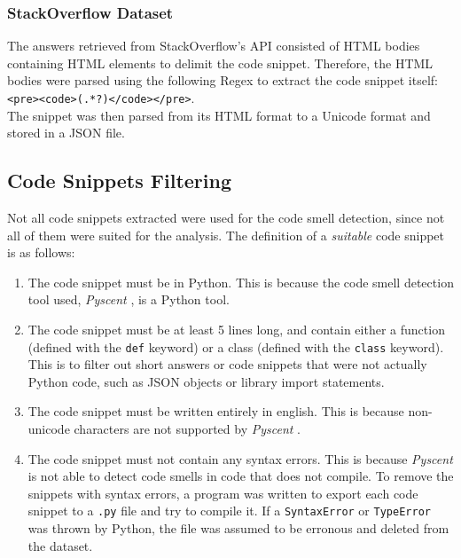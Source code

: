 \subsubsection{StackOverflow Dataset}
The answers retrieved from StackOverflow's API consisted of HTML bodies containing HTML elements to delimit the code snippet. Therefore, the HTML bodies were parsed using the following Regex to extract the code snippet itself: \texttt{<pre><code>(.*?)</code></pre>}. \\

The snippet was then parsed from its HTML format to a Unicode format and stored in a JSON file.


\subsection{Code Snippets Filtering}
Not all code snippets extracted were used for the code smell detection, since not all of them were suited for the analysis. The definition of a \textit{suitable} code snippet is as follows: \\

\begin{enumerate}
    \item The code snippet must be in Python. This is because the code smell detection tool used, \textit{Pyscent} , is a Python tool. \\

    \item The code snippet must be at least 5 lines long, and contain either a function (defined with the \texttt{def} keyword) or a class (defined with the \texttt{class} keyword). This is to filter out short answers or code snippets that were not actually Python code, such as JSON objects or library import statements. \\

    \item The code snippet must be written entirely in english. This is because non-unicode characters are not supported by \textit{Pyscent} . \\

    \item The code snippet must not contain any syntax errors. This is because \textit{Pyscent}  is not able to detect code smells in code that does not compile. To remove the snippets with syntax errors, a program was written to export each code snippet to a \texttt{.py} file and try to compile it. If a \texttt{SyntaxError} or \texttt{TypeError} was thrown by Python, the file was assumed to be erronous and deleted from the dataset. \\
\end{enumerate}


